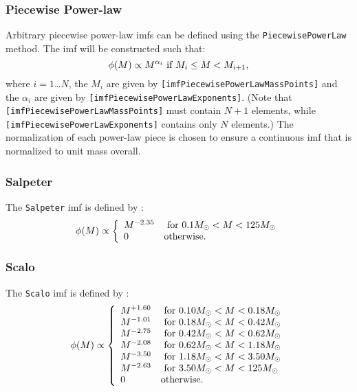 \subsubsection{Piecewise Power-law}

Arbitrary piecewise power-law {\gls{imf}}s can be defined using the {\tt PiecewisePowerLaw} method. The \gls{imf} will be constructed such that:
\begin{equation}
 \phi(M) \propto M^{\alpha_i} \hbox{ if } M_i \le M < M_{i+1},
\end{equation}
where $i=1$\ldots$N$, the $M_i$ are given by {\tt [imfPiecewisePowerLawMassPoints]} and the $\alpha_i$ are given by {\tt [imfPiecewisePowerLawExponents]}. (Note that {\tt [imfPiecewisePowerLawMassPoints]} must contain $N+1$ elements, while {\tt [imfPiecewisePowerLawExponents]} contains only $N$ elements.) The normalization of each power-law piece is chosen to ensure a continuous \gls{imf} that is normalized to unit mass overall.

\subsubsection{Salpeter}

The {\tt Salpeter} \gls{imf} is defined by \citep{salpeter_luminosity_1955}:
\begin{equation}
 \phi(M) \propto \left\{ \begin{array}{ll} M^{-2.35} & \hbox{ for } 0.1M_\odot < M < 125M_\odot \\ 0 & \hbox {otherwise.} \end{array} \right.
\end{equation}

\subsubsection{Scalo}

The {\tt Scalo} \gls{imf} is defined by \citep{scalo_stellar_1986}:
\begin{equation}
 \phi(M) \propto \left\{ \begin{array}{ll}
 M^{+1.60} & \hbox{ for } 0.10M_\odot < M < 0.18M_\odot \\
 M^{-1.01} & \hbox{ for } 0.18M_\odot < M < 0.42M_\odot \\
 M^{-2.75} & \hbox{ for } 0.42M_\odot < M < 0.62M_\odot \\
 M^{-2.08} & \hbox{ for } 0.62M_\odot < M < 1.18M_\odot \\
 M^{-3.50} & \hbox{ for } 1.18M_\odot < M < 3.50M_\odot \\
 M^{-2.63} & \hbox{ for } 3.50M_\odot < M < 125M_\odot \\
 0 & \hbox {otherwise.} \end{array} \right.
\end{equation}







